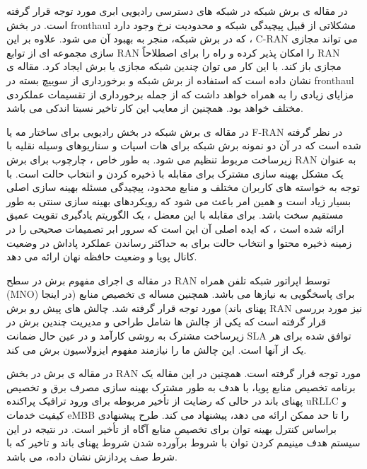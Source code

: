 در مقاله ی 
\cite{larsen2018fronthaul,costanzo2018network}
برش شبکه در شبکه های دسترسی رادیویی ابری مورد توجه قرار گرفته است. 
در بخش fronthaul مشکلاتی از قبیل پیچیدگی شبکه و محدودیت نرخ وجود دارد که در برش شبکه، منجر به بهبود آن می شود.
علاوه بر این ، C-RAN می تواند مجازی سازی مجموعه ای از توابع RAN را امکان پذیر کرده و راه را برای اصطلاحاً RAN مجازی باز کند. با این کار می توان چندین شبکه مجازی یا برش ایجاد کرد.
 مقاله ی
\cite{larsen2018fronthaul}
نشان داده است که استفاده از برش شبکه و برخورداری از سوییچ بسته در fronthaul
مزایای زیادی را به همراه خواهد داشت که از جمله برخورداری از تقسیمات عملکردی مختلف خواهد بود. همچنین از معایب این کار تاخیر نسبتا اندکی می باشد.

در مقاله ی 
\cite{fran}
برش شبکه در بخش رادیویی برای ساختار مه 
 یا F-RAN
  در نظر گرفته شده است که در آن دو نمونه برش شبکه برای هات اسپات و سناریوهای وسیله نقلیه با زیرساخت مربوط تنظیم می شود. به طور خاص ، چارچوب برای برش RAN به عنوان یک مشکل بهینه سازی مشترک برای مقابله با ذخیره کردن و انتخاب حالت است.
  با توجه به خواسته های کاربران مختلف و منابع محدود، پیچیدگی مسئله بهینه سازی اصلی بسیار زیاد است و همین امر باعث می شود که رویکردهای بهینه سازی سنتی به طور مستقیم سخت باشد.
 برای مقابله با این معضل ، یک الگوریتم یادگیری تقویت عمیق ارائه شده است ، که ایده اصلی آن این است که سرور ابر تصمیمات صحیحی را در زمینه ذخیره محتوا و انتخاب حالت برای به حداکثر رساندن عملکرد پاداش در وضعیت کانال پویا و وضعیت حافظه نهان ارائه می دهد.

در مقاله ی 
\cite{ranSlice, ranSlice1}
اجرای مفهوم برش در سطح RAN توسط اپراتور شبکه تلفن همراه (MNO) برای پاسخگویی به نیازها می باشد. همچنین مساله ی تخصیص منابع (در اینجا پهنای باند) مورد توجه قرار گرفته شد.
چالش های پیش رو برش RAN نیز مورد بررسی قرار گرفته است که یکی از چالش ها
شامل طراحی و مدیریت چندین برش در زیرساخت مشترک به روشی کارآمد و در عین حال ضمانت SLA توافق شده برای هر یک از آنها است.
این چالش ما را نیازمند مفهوم ایزولاسیون برش می کند.

در مقاله ی 
\cite{ranslice2}
برش در بخش RAN مورد توجه قرار گرفته است.
همچنین
در این مقاله یک برنامه تخصیص منابع پویا، با هدف به طور مشترک بهینه سازی مصرف برق و تخصیص پهنای باند در حالی که رضایت از تأخیر مربوطه برای ورود ترافیک پراکنده uRLLC و کیفیت خدمات eMBB را تا حد ممکن ارائه می دهد، پیشنهاد می کند.
طرح پیشنهادی براساس کنترل بهینه توان برای تخصیص منابع آگاه از تأخیر است.
در نتیجه در این سیستم هدف مینیمم کردن توان با شروط برآورده شدن شروط پهنای باند و  تاخیر که با شرط صف پردازش نشان داده، می باشد.

